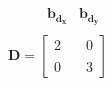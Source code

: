 \documentclass[preview]{standalone}
\begin{document}
\begin{align*}
\begin{array}{c}\begin{matrix}\hspace{1cm} \mathbf{b_{d_x}} & \mathbf{b_{d_y}}  \end{matrix} \\  \mathbf{D} = \begin{bmatrix} 2 & \quad 0 \\ \\0 & \quad 3 \end{bmatrix} \end{array}
\end{align*}
\end{document}
